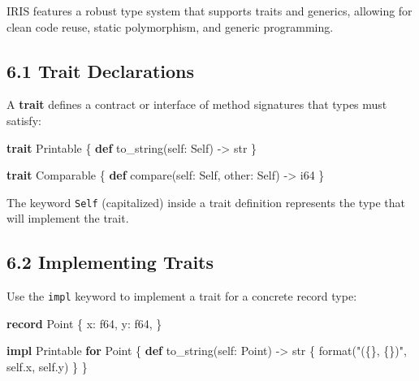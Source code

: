 \documentclass[
  english,
]{book}
\newenvironment{Shaded}{\begin{snugshade}}{\end{snugshade}}
\newcommand{\ControlFlowTok}[1]{\textcolor[rgb]{0.77,0.53,0.75}{\textbf{#1}}}
\newcommand{\DataTypeTok}[1]{\textcolor[rgb]{0.31,0.79,0.69}{#1}}
\newcommand{\FunctionTok}[1]{\textcolor[rgb]{0.86,0.86,0.67}{#1}}
\newcommand{\KeywordTok}[1]{\textcolor[rgb]{0.34,0.61,0.84}{\textbf{#1}}}
\newcommand{\NormalTok}[1]{\textcolor[rgb]{0.83,0.83,0.83}{#1}}
\newcommand{\OperatorTok}[1]{\textcolor[rgb]{0.83,0.83,0.83}{#1}}
\newcommand{\StringTok}[1]{\textcolor[rgb]{0.81,0.57,0.47}{#1}}
\begin{document}
IRIS features a robust type system that supports traits and generics,
allowing for clean code reuse, static polymorphism, and generic
programming.

\subsection{6.1 Trait Declarations}\label{trait-declarations}

A \textbf{trait} defines a contract or interface of method signatures
that types must satisfy:

\begin{Shaded}
\begin{Highlighting}[]
\KeywordTok{trait}\NormalTok{ Printable \{}
    \KeywordTok{def}\NormalTok{ to\_string(self: Self) }\OperatorTok{{-}\textgreater{}} \DataTypeTok{str}
\NormalTok{\}}

\KeywordTok{trait}\NormalTok{ Comparable \{}
    \KeywordTok{def}\NormalTok{ compare(self: Self, other: Self) }\OperatorTok{{-}\textgreater{}} \DataTypeTok{i64}
\NormalTok{\}}
\end{Highlighting}
\end{Shaded}

The keyword \texttt{Self} (capitalized) inside a trait definition
represents the type that will implement the trait.

\subsection{6.2 Implementing Traits}\label{implementing-traits}

Use the \texttt{impl} keyword to implement a trait for a concrete record
type:

\begin{Shaded}
\begin{Highlighting}[]
\KeywordTok{record}\NormalTok{ Point \{}
\NormalTok{    x: }\DataTypeTok{f64}\NormalTok{,}
\NormalTok{    y: }\DataTypeTok{f64}\NormalTok{,}
\NormalTok{\}}

\KeywordTok{impl}\NormalTok{ Printable }\ControlFlowTok{for}\NormalTok{ Point \{}
    \KeywordTok{def}\NormalTok{ to\_string(self: Point) }\OperatorTok{{-}\textgreater{}} \DataTypeTok{str}\NormalTok{ \{}
        \FunctionTok{format}\NormalTok{(}\StringTok{"(\{\}, \{\})"}\NormalTok{, self}\OperatorTok{.}\NormalTok{x, self}\OperatorTok{.}\NormalTok{y)}
\NormalTok{    \}}
\NormalTok{\}}
\end{Highlighting}
\end{Shaded}
\end{document}
